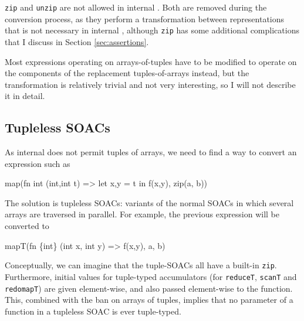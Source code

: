 \texttt{zip} and \texttt{unzip} are not allowed in internal \LO{}.
Both are removed during the conversion process, as they perform a
transformation between representations that is not necessary in
internal \LO{}, although \texttt{zip} has some additional
complications that I discuss in Section \ref{sec:assertions}.

Most expressions operating on arrays-of-tuples have to be modified to
operate on the components of the replacement tuples-of-arrays instead,
but the transformation is relatively trivial and not very interesting,
so I will not describe it in detail.

\subsection{Tupleless SOACs}

As internal \LO{} does not permit tuples of arrays, we need to find a
way to convert an expression such as
\begin{colorcode}
map(fn int ({int,int} t) =>
      let {x,y} = t in
      f(x,y),
    zip(a, b))
\end{colorcode}
The solution is tupleless SOACs: variants of the normal SOACs in which
several arrays are traversed in parallel.  For example, the previous
expression will be converted to
\begin{colorcode}
mapT(fn \{int\} (int x, int y) =>
       f(x,y),
     a, b)
\end{colorcode}
Conceptually, we can imagine that the tuple-SOACs all have a built-in
\texttt{zip}.  Furthermore, initial values for tuple-typed
accumulators (for \texttt{reduceT}, \texttt{scanT} and
\texttt{redomapT}) are given element-wise, and also passed
element-wise to the function.  This, combined with the ban on arrays
of tuples, implies that no parameter of a function in a tupleless SOAC
is ever tuple-typed.

